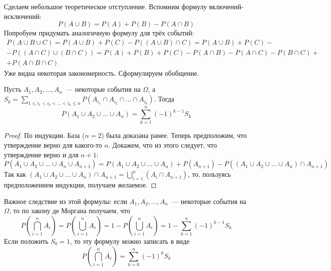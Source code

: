 \documentclass[a4paper,12pt]{article}
\begin{document}
Сделаем небольшое теоретическое отступление. Вспомним формулу включений-исклю\-чений:
\[P(A \cup B) = P(A) + P(B) - P(A \cap B)\]
Попробуем придумать аналогичную формулу для трёх событий:
\begin{multline*}
	P(A \cup B \cup C) = P(A \cup B) + P(C) - P((A \cup B) \cap C) = P(A \cup B) + P(C) - \\ - P((A \cap C) \cup (B \cap C)) = P(A) + P(B) + P(C) - P(A \cap B) - P(A \cap C) - P(B \cap C) + \\ + P(A \cap B \cap C)
\end{multline*}
Уже видна некоторая закономерность. Сформулируем обобщение.
\begin{lemma}
	Пусть \(A_1, A_2, \ldots, A_n\)~--- некоторые события на \(\Omega\), а \(S_k = \sum\limits_{1 \leq i_1 < i_2 < \ldots < i_k \leq n}P(A_{i_1} \cap A_{i_2} \cap \ldots \cap A_{i_k})\). Тогда \[P(A_1 \cup A_2 \cup \ldots \cup A_n) = \sum_{k = 1}^{n}(-1)^{k - 1}S_k\]
\end{lemma}
\begin{proof}
	По индукции. База (\(n = 2\)) была доказана ранее. Теперь предположим, что утверждение верно для какого-то \(n\). Докажем, что из этого следует, что утверждение верно и для \(n + 1\):
	\[P(A_1 \cup A_2 \cup \ldots \cup A_n \cup A_{n + 1}) = P(A_1 \cup A_2 \cup \ldots \cup A_n) + P(A_{n + 1}) - P((A_1 \cup A_2 \cup \ldots \cup A_n) \cap A_{n + 1})\]
	Так как \((A_1 \cup A_2 \cup \ldots \cup A_n) \cap A_{n + 1} = \bigcup_{i = 1}^{n}(A_i \cap A_{n + 1})\), то, пользуясь предположением индукции, получаем желаемое.
\end{proof}
\begin{remark}
	Важное следствие из этой формулы: если \(A_1, A_2, \ldots, A_n\)~--- некоторые события на \(\Omega\), то по закону де Моргана получаем, что
	\[P\left(\bigcap_{i = 1}^{n}\overline{A_i}\right) = P\left(\overline{\bigcup_{i = 1}^{n} A_i}\right) = 1 - P\left(\bigcup_{i = 1}^{n} A_i\right) = 1 - \sum_{k = 1}^{n}(-1)^{k - 1}S_k\]
	Если положить \(S_0 = 1\), то эту формулу можно записать в виде
	\[P\left(\bigcap_{i = 1}^{n}\overline{A_i}\right) = \sum_{k = 0}^{n}(-1)^{k}S_k\]
\end{remark}
\end{document}
